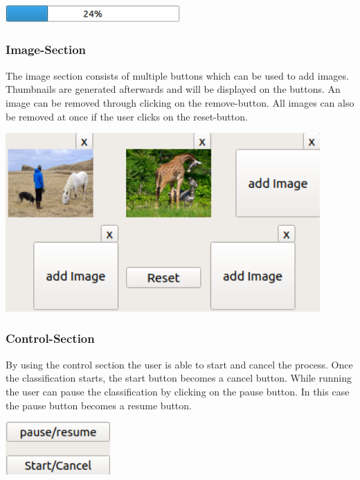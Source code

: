 \documentclass[parskip=full]{scrartcl}
\begin{document}
\begin{center}
\includegraphics[width=0.5\textwidth]{images/ProgressBar.png}
\end{center}

\pagebreak



\subsubsection {Image-Section}

The image section consists of multiple buttons which can be used to add images. Thumbnails are generated afterwards and will be displayed on the buttons. An image can be removed through clicking on the remove-button. All images can also be removed at once if the user clicks on the reset-button.

\begin{center}
\includegraphics[width=0.9\textwidth]{images/ImageSection.png}
\end{center}

\subsubsection {Control-Section}

By using the control section the user is able to start and cancel the process. Once the classification starts, the start button becomes a cancel button. While running the user can pause the classification by clicking on the pause button. In this case the pause button becomes a resume button.

\begin{center}
\includegraphics[width=0.3\textwidth]{images/ControlSection.png}
\end{center}
\end{document}

